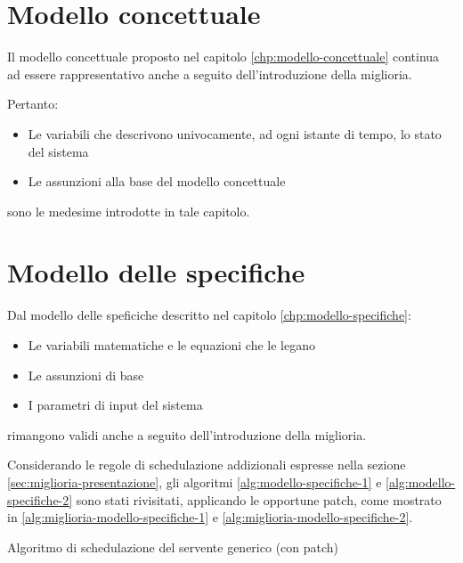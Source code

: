 \section{Modello concettuale}
Il modello concettuale proposto nel capitolo \ref{chp:modello-concettuale} continua ad essere rappresentativo anche a seguito dell'introduzione della miglioria. 

Pertanto:
\begin{itemize}
\item Le variabili che descrivono univocamente, ad ogni istante di tempo, lo stato del sistema
\item Le assunzioni alla base del modello concettuale
\end{itemize}
sono le medesime introdotte in tale capitolo.
\section{Modello delle specifiche}
Dal modello delle speficiche descritto nel capitolo \ref{chp:modello-specifiche}:
\begin{itemize}
\item Le variabili matematiche e le equazioni che le legano
\item Le assunzioni di base
\item I parametri di input del sistema
\end{itemize}
rimangono validi anche a seguito dell'introduzione della miglioria.

Considerando le regole di schedulazione addizionali espresse nella sezione \ref{sec:miglioria-presentazione}, gli algoritmi \ref{alg:modello-specifiche-1} e \ref{alg:modello-specifiche-2} sono stati rivisitati, applicando le opportune patch, come mostrato in \ref{alg:miglioria-modello-specifiche-1} e \ref{alg:miglioria-modello-specifiche-2}.

\begin{algorithm}[ht]
\SetAlgoLined
{}
\caption{Algoritmo di schedulazione del servente generico (con {\color{purple}patch})}
\label{alg:miglioria-modello-specifiche-1}
\end{algorithm}

